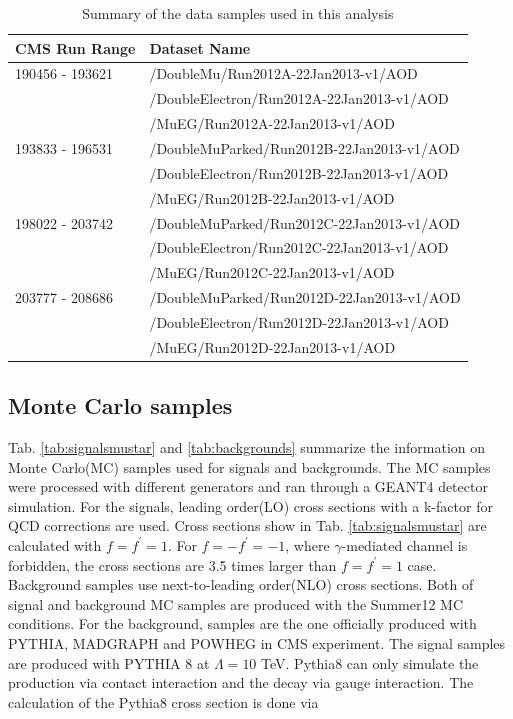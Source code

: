\begin{center}
\begin{table}[h!]
\begin{center}
\begin{tabular}{|l|l|}
\hline
CMS Run Range & Dataset Name \\
\hline
190456 - 193621 & /DoubleMu/Run2012A-22Jan2013-v1/AOD \\
& /DoubleElectron/Run2012A-22Jan2013-v1/AOD \\
& /MuEG/Run2012A-22Jan2013-v1/AOD \\
\hline
193833 - 196531 & /DoubleMuParked/Run2012B-22Jan2013-v1/AOD \\
& /DoubleElectron/Run2012B-22Jan2013-v1/AOD \\
& /MuEG/Run2012B-22Jan2013-v1/AOD \\
\hline
198022 - 203742 & /DoubleMuParked/Run2012C-22Jan2013-v1/AOD \\
& /DoubleElectron/Run2012C-22Jan2013-v1/AOD \\
& /MuEG/Run2012C-22Jan2013-v1/AOD \\
\hline
203777 - 208686 & /DoubleMuParked/Run2012D-22Jan2013-v1/AOD \\
& /DoubleElectron/Run2012D-22Jan2013-v1/AOD \\
& /MuEG/Run2012D-22Jan2013-v1/AOD \\
\hline

\end{tabular}
\end{center}
\caption{\label{tab:DatasetName}Summary of the data samples used in this analysis}
\end{table}
\end{center}

\subsection{Monte Carlo samples}

Tab. \ref{tab:signalsmustar} and \ref{tab:backgrounds} summarize the information on Monte Carlo(MC) samples used for signals and backgrounds. The MC samples were processed with different generators and ran through a GEANT4 \cite{Allison:2006ve} detector simulation. For the signals, leading order(LO) cross sections with a k-factor for QCD corrections \cite{kfactor} are used. Cross sections show in Tab. \ref{tab:signalsmustar} are calculated with $f = f^{\prime} = 1$. For $f = -f^{\prime} = -1$, where $\gamma$-mediated channel is forbidden, the cross sections are 3.5 times larger than $f = f^{\prime} = 1$ case. Background samples use next-to-leading order(NLO) cross sections. Both of signal and background MC samples are produced with the Summer12 MC conditions. For the background, samples are the one officially produced with PYTHIA, MADGRAPH \cite{madgraph} and POWHEG \cite{Alioli:2008gx} in CMS experiment. \newline
The signal samples are produced with PYTHIA 8 \cite{Sjostrand:2006za} at $\Lambda = 10$ TeV. {\sc Pythia8} can only simulate the production via contact interaction and the decay via gauge interaction. The calculation of the {\sc Pythia8} cross section is done via

